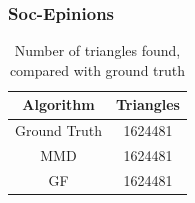 \documentclass[a4paper,11pt, twoside]{article}
\begin{document}
            \subsubsection{Soc-Epinions}
            
            \begin{table}[h!]
                    \centering
                \small
                \begin{tabular}{cc}
                    \toprule
                    \textbf{Algorithm}  & \textbf{Triangles} \\
                    \midrule
                    Ground Truth   & 1624481  \\
                    MMD            & 1624481  \\
                    GF    & 1624481  \\
                    \bottomrule
                \end{tabular}
                    \label{tab:triangles}
                    \caption{Number of triangles found, compared with ground truth}
            \end{table}
        
\end{document}
